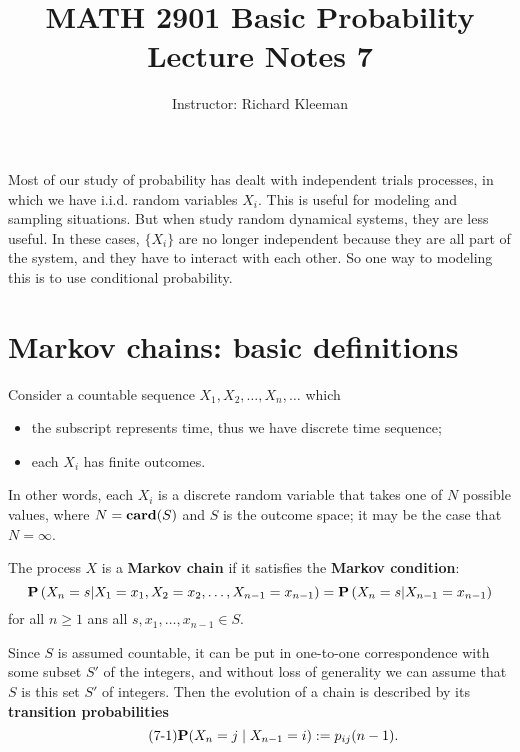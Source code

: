 


\title{MATH 2901 Basic Probability Lecture Notes 7}
\author{Instructor: Richard Kleeman}
\date{}
\maketitle


Most of our study of probability has dealt with independent trials processes, in which we have i.i.d. random variables $X_i$. This is useful for modeling and sampling situations. But when study random dynamical systems, they are less useful. In these cases, $\{X_i\}$ are no longer independent because they are all part of the system, and they have to interact with each other. So one way to modeling this is to use conditional probability. 

\section{Markov chains: basic definitions}
Consider a countable sequence $X_1, X_2, \dots, X_n, \dots$ which 
\begin{itemize}
    \item the subscript represents time, thus we have discrete time sequence;
    \item each $X_i$ has finite outcomes.
\end{itemize}
In other words, each $X_i$ is a discrete random variable that takes one of $N$ possible values, where 
$N = \mathbf{card}(S)$ and $S$ is the outcome space; it may be the case that $N = \infty$.

\begin{definition}
The process $X$ is a \textbf{Markov chain} if it satisfies the \textbf{Markov condition}:
\begin{equation*}
    \mathbf{P}\left(X_{n}=s | X_{1}=x_{1}, X_{2}=x_{2}, \ldots, X_{n-1}=x_{n-1}\right)=\mathbf{P}\left(X_{n}=s | X_{n-1}=x_{n-1}\right)
\end{equation*}
for all $n\geq 1$ ans all $s, x_1, \dots, x_{n-1} \in S$.
\end{definition}
Since $S$ is assumed countable, it can be put in one-to-one correspondence with some subset $S'$ of the integers, and without loss of generality we can assume that $S$ is this set $S'$ of integers. Then the evolution of a chain is described by its \textbf{transition probabilities} 
\begin{equation}
    \label{eq:7.1}
    \tag{7-1}
    \mathbf{P}(X_{n} = j \;\vert\; X_{n-1} = i) := p_{ij}(n-1).
\end{equation}


